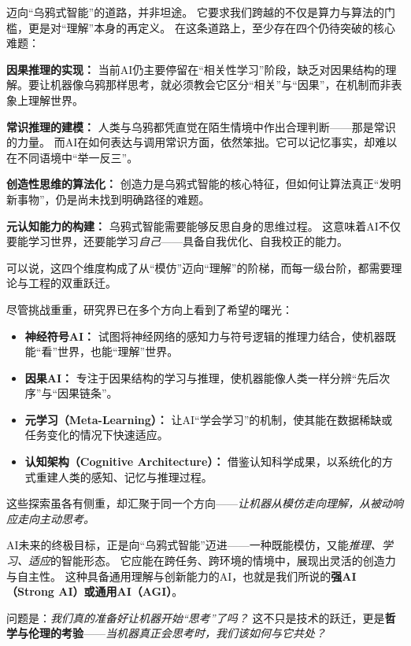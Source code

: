 迈向“乌鸦式智能”的道路，并非坦途。
它要求我们跨越的不仅是算力与算法的门槛，更是对“理解”本身的再定义。  
在这条道路上，至少存在四个仍待突破的核心难题：

\textbf{因果推理的实现：} 当前AI仍主要停留在“相关性学习”阶段，缺乏对因果结构的理解。要让机器像乌鸦那样思考，就必须教会它区分“相关”与“因果”，在机制而非表象上理解世界。

\textbf{常识推理的建模：} 人类与乌鸦都凭直觉在陌生情境中作出合理判断——那是常识的力量。  而AI在如何表达与调用常识方面，依然笨拙。它可以记忆事实，却难以在不同语境中“举一反三”。

\textbf{创造性思维的算法化：} 创造力是乌鸦式智能的核心特征，但如何让算法真正“发明新事物”，仍是尚未找到明确路径的难题。

\textbf{元认知能力的构建：} 乌鸦式智能需要能够反思自身的思维过程。  
这意味着AI不仅要能学习世界，还要能学习\emph{自己}——具备自我优化、自我校正的能力。

可以说，这四个维度构成了从“模仿”迈向“理解”的阶梯，而每一级台阶，都需要理论与工程的双重跃迁。

尽管挑战重重，研究界已在多个方向上看到了希望的曙光：
\begin{itemize}
\item \textbf{神经符号AI：} 试图将神经网络的感知力与符号逻辑的推理力结合，使机器既能“看”世界，也能“理解”世界。  

\item \textbf{因果AI：} 专注于因果结构的学习与推理，使机器能像人类一样分辨“先后次序”与“因果链条”。

\item \textbf{元学习（Meta-Learning）：} 让AI“学会学习”的机制，使其能在数据稀缺或任务变化的情况下快速适应。

\item \textbf{认知架构（Cognitive Architecture）：} 借鉴认知科学成果，以系统化的方式重建人类的感知、记忆与推理过程。
\end{itemize}
这些探索虽各有侧重，却汇聚于同一个方向——\emph{让机器从模仿走向理解，从被动响应走向主动思考。}

AI未来的终极目标，正是向“乌鸦式智能”迈进——一种既能模仿，又能\emph{推理、学习、适应}的智能形态。
它应能在跨任务、跨环境的情境中，展现出灵活的创造力与自主性。
这种具备通用理解与创新能力的AI，也就是我们所说的\textbf{强AI（Strong AI）或通用AI（AGI）}。

问题是：\emph{我们真的准备好让机器开始“思考”了吗？} 这不只是技术的跃迁，更是\textbf{哲学与伦理的考验}——\emph{当机器真正会思考时，我们该如何与它共处？}

